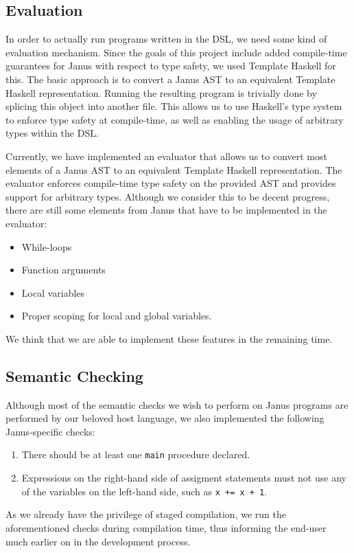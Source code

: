 \documentclass[12pt,a4paper]{article}
\newcommand{\code}[1]{\texttt{#1}}
\begin{document}
\subsection{Evaluation}
In order to actually run programs written in the DSL, we need some kind of evaluation mechanism. Since the goals of this project include added compile-time guarantees for Janus with respect to type safety, we used Template Haskell for this. The basic approach is to convert a Janus AST to an equivalent Template Haskell representation. Running the resulting program is trivially done by splicing this object into another file. This allows us to use Haskell's type system to enforce type safety at compile-time, as well as enabling the usage of arbitrary types within the DSL.

Currently, we have implemented an evaluator that allows us to convert most elements of a Janus AST to an equivalent Template Haskell representation. The evaluator enforces compile-time type safety on the provided AST and provides support for arbitrary types. Although we consider this to be decent progress, there are still some elements from Janus that have to be implemented in the evaluator:
\begin{itemize}
\item 
While-loops
\item
Function arguments
\item
Local variables
\item
Proper scoping for local and global variables. 
\end{itemize}
We think that we are able to implement these features in the remaining time. 

\subsection{Semantic Checking}
Although most of the semantic checks we wish to perform on Janus programs are performed by our beloved host language, we also implemented the following Janus-specific checks:
\begin{enumerate}
\item There should be at least one \code{main} procedure declared.
\item Expressions on the right-hand side of assigment statements must not use any of the variables on the left-hand side, such as \code{x += x + 1}.
\end{enumerate}
As we already have the privilege of staged compilation, we run the aforementioned checks during compilation time, thus informing the end-user much earlier on in the development process.
\end{document}
